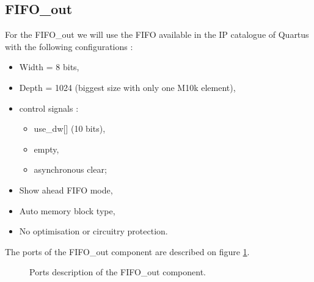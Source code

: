 \documentclass[11pt]{article}
\begin{document}
\subsection{FIFO\_out}
For the FIFO\_out we will use the FIFO available in the IP catalogue of Quartus with the following configurations :
\begin{itemize}
    \item Width = 8 bits,
    \item Depth = 1024 (biggest size with only one M10k element),
    \item control signals : \begin{itemize}
        \item use\_dw[] (10 bits),
        \item empty,
        \item asynchronous clear; \end{itemize}
    \item Show ahead FIFO mode,
    \item Auto memory block type,
    \item No optimisation or circuitry protection.
\end{itemize}

The ports of the FIFO\_out component are described on figure \ref{fifo_out_ports}.
\begin{figure}[H]
        \caption{Ports description of the FIFO\_out component.}
        \label{fifo_out_ports}
\end{figure}
\end{document}
